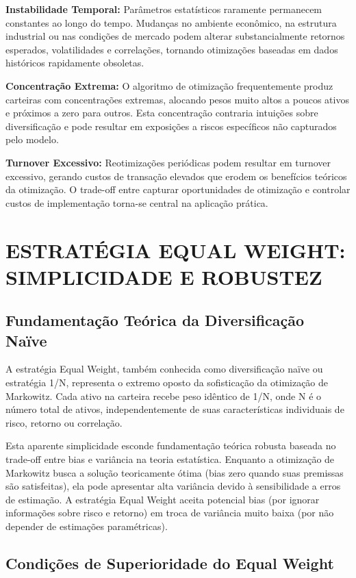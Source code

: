 \textbf{Instabilidade Temporal:} Parâmetros estatísticos raramente permanecem constantes ao longo do tempo. Mudanças no ambiente econômico, na estrutura industrial ou nas condições de mercado podem alterar substancialmente retornos esperados, volatilidades e correlações, tornando otimizações baseadas em dados históricos rapidamente obsoletas.

\textbf{Concentração Extrema:} O algoritmo de otimização frequentemente produz carteiras com concentrações extremas, alocando pesos muito altos a poucos ativos e próximos a zero para outros. Esta concentração contraria intuições sobre diversificação e pode resultar em exposições a riscos específicos não capturados pelo modelo.

\textbf{Turnover Excessivo:} Reotimizações periódicas podem resultar em turnover excessivo, gerando custos de transação elevados que erodem os benefícios teóricos da otimização. O trade-off entre capturar oportunidades de otimização e controlar custos de implementação torna-se central na aplicação prática.

\section{ESTRATÉGIA EQUAL WEIGHT: SIMPLICIDADE E ROBUSTEZ}

\subsection{Fundamentação Teórica da Diversificação Naïve}

A estratégia Equal Weight, também conhecida como diversificação naïve ou estratégia 1/N, representa o extremo oposto da sofisticação da otimização de Markowitz. Cada ativo na carteira recebe peso idêntico de 1/N, onde N é o número total de ativos, independentemente de suas características individuais de risco, retorno ou correlação.

Esta aparente simplicidade esconde fundamentação teórica robusta baseada no trade-off entre bias e variância na teoria estatística. Enquanto a otimização de Markowitz busca a solução teoricamente ótima (bias zero quando suas premissas são satisfeitas), ela pode apresentar alta variância devido à sensibilidade a erros de estimação. A estratégia Equal Weight aceita potencial bias (por ignorar informações sobre risco e retorno) em troca de variância muito baixa (por não depender de estimações paramétricas).

\subsection{Condições de Superioridade do Equal Weight}

